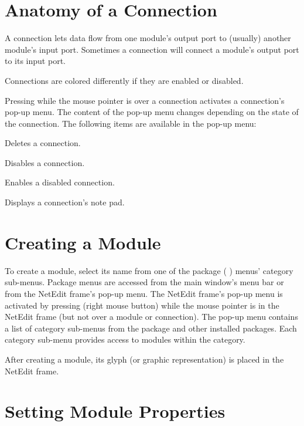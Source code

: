 \section{Anatomy of a Connection}
\label{sec:anatcon}

A connection lets data flow from one module's output port to (usually) another
module's input port.  Sometimes a connection will connect a module's
output port to its input port.

Connections are colored differently if they are enabled or disabled.

Pressing  while the mouse pointer is over a connection
activates a connection's pop-up menu.  The content of the pop-up menu
changes depending on the state of the connection. The following items are
available in the pop-up menu:

\begin{description}
   Deletes a connection.
  
   Disables a connection.
  
   Enables a disabled connection.

   Displays a connection's note pad.
\end{description}

\section{Creating a Module}
\label{sec:creatingmodules}

To create a module, select its name from one of the package (\eg{}
\sr) menus' category sub-menus. Package menus are accessed from the
main window's menu bar or from the NetEdit frame's pop-up menu.  The
NetEdit frame's pop-up menu is activated by pressing
 (right mouse button) while the mouse pointer is in
the NetEdit frame (but not over a module or connection).  The pop-up
menu contains a list of category sub-menus from the \sr{} package and
other installed packages.  Each category sub-menu provides access to
modules within the category.

After creating a module, its glyph (or graphic representation) is 
placed in the NetEdit frame.

\section{Setting Module Properties}
\label{sec:setmodprops}

